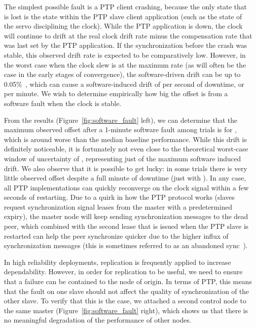 The simplest possible fault is a PTP client crashing, because the only state that is lost is the state within the PTP slave client application (such as the state of the servo disciplining the clock). While the PTP application is down, the clock will continue to drift at the real clock drift rate minus the compensation rate that was last set by the PTP application. If the synchronization before the crash was stable, this observed drift rate is expected to be comparatively low. However, in the worst case when the clock slew is at the maximum rate (as will often be the case in the early stages of convergence), the software-driven drift can be up to 0.05\%~\cite{adjtimex}, which can cause a software-induced drift of  per second of downtime, or \fTimeMS{\windowOfUncertaintyOneMinute} per minute. We wish to determine empirically how big the offset is from a software fault when the clock is stable.


From the results (Figure~\ref{fig:software_fault} left), we can determine that the maximum observed offset after a 1-minute software fault among \fNum{\bSoftwareFaultNumProfiles} trials is \fTime{\cmpMax} for \fVendor{\cmpMaxArg}, which is around  worse than the median baseline performance. While this drift is definitely noticeable, it is fortunately not even close to the theoretical worst-case window of uncertainty of \fTimeMS{\windowOfUncertaintyOneMinute}, representing just \fPercentage[2]{\cmpMax/\windowOfUncertaintyOneMinute} of the maximum software induced drift. We also observe that it is possible to get lucky: in some trials there is very little observed offset despite a full minute of downtime (just \fTime{\cmpMin} with \fVendor{\cmpMinArg}). In any case, all PTP implementations can quickly reconverge on the clock signal within a few seconds of restarting. Due to a quirk in how the PTP protocol works (slaves request synchronization signal leases from the master with a predetermined expiry), the master node will keep sending synchronization messages to the dead peer, which combined with the second lease that is issued when the PTP slave is restarted can help the peer synchronize quicker due to the higher influx of synchronization messages (this is sometimes referred to as an abandoned sync~\cite{sptp}).

In high reliability deployments, replication is frequently applied to increase dependability. However, in order for replication to be useful, we need to ensure that a failure can be contained to the node of origin. In terms of PTP, this means that the fault on one slave should not affect the quality of synchronization of the other slave. To verify that this is the case, we attached a second control node to the same master (Figure~\ref{fig:software_fault} right), which shows us that there is no meaningful degradation of the performance of other nodes.

